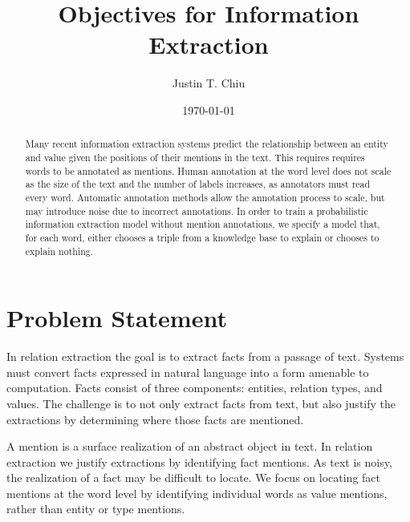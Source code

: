 \documentclass[12pt]{article}
\title{Objectives for Information Extraction}
\author{
Justin T. Chiu
}
\date{\today}
\begin{document}
\maketitle

\begin{abstract}
Many recent information extraction systems predict the relationship between
an entity and value given the positions of their mentions in the text.
This requires requires words to be annotated as mentions.
Human annotation at the word level does not scale as the size of the text
and the number of labels increases, as annotators must read every word.
Automatic annotation methods allow the annotation process to scale,
but may introduce noise due to incorrect annotations.
In order to train a probabilistic information extraction model without mention
annotations, we specify a model that, for each word,
either chooses a triple from a knowledge base to explain or chooses to explain nothing.
\end{abstract}

\section{Problem Statement}

In relation extraction the goal is to extract facts from a passage of text.
Systems must convert facts expressed in natural language into a form
amenable to computation.
Facts consist of three components: entities, relation types, and values.
The challenge is to not only extract facts from text, but also
justify the extractions by determining where those facts are mentioned.

A mention is a surface realization of an abstract object in text.
In relation extraction we justify extractions by identifying fact mentions.
As text is noisy, the realization of a fact may be difficult to locate.
We focus on locating fact mentions at the word level by identifying
individual words as value mentions, rather than entity or type mentions.

\begin{comment}
Note on related work:
Except for \citet{zeng2018copy}, prior work has either assumed that the locations of
entities and values are given as input features or that the locations of entities and values
are observed at training time.
\end{comment}
\end{document}
